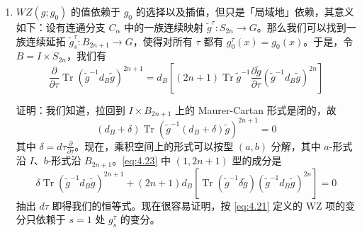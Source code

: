 \begin{enumerate}
  \item $WZ(g;g_0)$ 的值依赖于 $g_0$ 的选择以及插值，但只是「局域地」依赖，其意义如下：设有连通分支 $C_{\alpha}$ 中的一族连续映射 $\tilde g^\tau:S_{2n}\to G$。那么我们可以找到一族连续延拓 $\tilde g^\tau_s:B_{2n+1}\to G$，使得对所有 $\tau$ 都有 $g^\tau_0(x)=g_0(x)$。于是，令 $B=I\times S_{2n}$，我们有
  \begin{equation}
    \frac{\partial}{\partial\tau}\operatorname{Tr}(\tilde g^{-1}d_B\tilde g)^{2n+1}
    =d_B\left[(2n+1)\operatorname{Tr}\tilde g^{-1}\frac{\partial\tilde g}{\partial\tau}(\tilde g^{-1}d_B\tilde g)^{2n}\right]
    \tag{4.22}
    \label{eq:4.22}
  \end{equation}

  证明：我们知道，拉回到 $I\times B_{2n+1}$ 上的 Maurer-Cartan 形式是闭的，故
  \begin{equation}
    (d_B+\delta)\operatorname{Tr}(\tilde g^{-1}(d_B+\delta)\tilde g)^{2n+1}=0
    \tag{4.23}
    \label{eq:4.23}
  \end{equation}
  其中 $\delta=d\tau\frac{\partial}{\partial\tau}$。现在，乘积空间上的形式可以按型 $(a,b)$ 分解，其中 $a$-形式沿 $I$、$b$-形式沿 $B_{2n+1}$。\eqref{eq:4.23} 中 $(1,2n+1)$ 型的成分是
  \begin{equation}
    \delta\operatorname{Tr}(\tilde g^{-1}d_B\tilde g)^{2n+1}
    +(2n+1)d_B\left[\operatorname{Tr}(\tilde g^{-1}\delta\tilde g)(\tilde g^{-1}d_B\tilde g)^{2n}\right]=0
    \tag{4.24}
    \label{eq:4.24}
  \end{equation}
  抽出 $d\tau$ 即得我们的恒等式。现在很容易证明，按 \eqref{eq:4.21} 定义的 WZ 项的变分只依赖于 $s=1$ 处 $g^\tau_s$ 的变分。
\end{enumerate}


